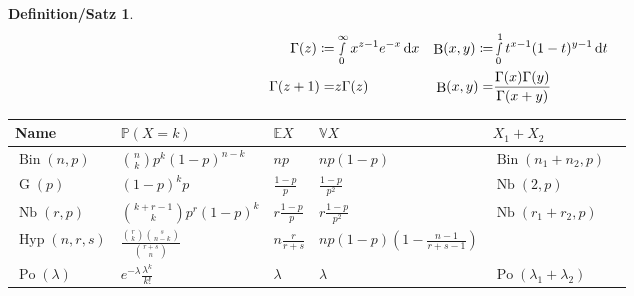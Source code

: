 \documentclass[a4paper,8pt]{article}
\theoremstyle{nonumberbreak}
\newtheorem{defsatz}[definition]{Definition/Satz}
\newcommand{\defas}{\coloneqq}
\DeclareMathOperator{\Bin}{Bin}
\DeclareMathOperator{\Hyp}{Hyp}
\DeclareMathOperator{\Po}{Po}
\DeclareMathOperator{\Nb}{Nb}
\DeclareMathOperator{\G}{G}
\DeclareMathOperator{\Bd}{B}
\renewcommand{\P}{\mathbb{P}}
\newcommand{\E}{\mathbb{E}}
\newcommand{\V}{\mathbb{V}}
\begin{document}
\begin{minipage}{11.35cm}
	\begin{defsatz}
		\begin{align*}
			\Gamma(z)\defas&\smallint_0^\infty x^{z-1}e^{-x}\dd{x} & \Bd(x, y)\defas&\smallint_0^1 t^{x-1}(1-t)^{y-1}\dd{t}\\
			\Gamma(z+1)=&z\Gamma(z) & \Bd(x, y) =& \frac{\Gamma(x)\Gamma(y)}{\Gamma(x+y)}
		\end{align*}
	\end{defsatz}

	\tiny
	\begin{tabular}{ | M{1.2cm} | M{2.2cm} | M{1cm} | M{2.7cm} | M{2cm} | N}
		\hline
		Name & $\P(X=k)$ & $\E X$ & $\V X$ & $X_1 + X_2$ & \\ \hline \hline
		$\Bin(n, p)$ & $\binom{n}{k}p^k(1-p)^{n-k}$ & $np$ & $np(1-p)$ & $\Bin(n_1+n_2, p)$ & \\ \hline
		$\G(p)$ & $(1-p)^kp$ & $\frac{1-p}{p}$ & $\frac{1-p}{p^2}$ & $\Nb(2, p)$ & \\ \hline
		$\Nb(r, p)$ & $\binom{k+r-1}{k}p^r(1-p)^k$ & $r\frac{1-p}{p}$ & $r\frac{1-p}{p^2}$ & $\Nb(r_1 + r_2, p)$ & \\ \hline
		$\Hyp(n, r, s)$ & $\frac{\binom{r}{k}\binom{s}{n-k}}{\binom{r+s}{n}}$ & $n\frac{r}{r+s}$ & $np(1-p)\left(1-\frac{n-1}{r+s-1}\right)$ & & \\ \hline
		$\Po(\lambda)$ & $e^{-\lambda}\frac{\lambda^k}{k!}$ & $\lambda$ & $\lambda$ & $\Po(\lambda_1 + \lambda_2)$ & \\ \hline
	\end{tabular}
\end{minipage}
\tiny
\end{document}
